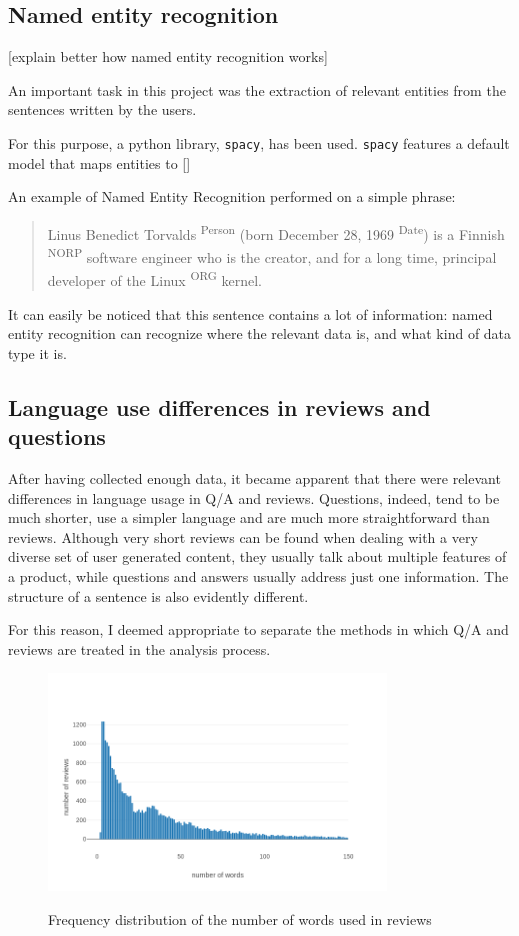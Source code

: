 \documentclass[LaM,binding=0.6cm]{sapthesis}
\begin{document}
\subsection{Named entity recognition}

[explain better how named entity recognition works]

An important task in this project was the extraction of relevant entities from the sentences written by the users.

For this purpose, a python library, \texttt{spacy}, has been used. \texttt{spacy} features a default model that maps entities to []

An example of Named Entity Recognition performed on a simple phrase:
\begin{quote}
Linus Benedict Torvalds \textsuperscript{Person} (born December 28, 1969 \textsuperscript{Date}) is a Finnish \textsuperscript{NORP} software engineer who is the creator, and for a long time, principal developer of the Linux \textsuperscript{ORG} kernel.
\end{quote}

It can easily be noticed that this sentence contains a lot of information: named entity recognition can recognize where the relevant data is, and what kind of data type it is.

\subsection{Language use differences in reviews and questions}

After having collected enough data, it became apparent that there were relevant differences in language usage in Q/A and reviews. Questions, indeed, tend to be much shorter, use a simpler language and are much more straightforward than reviews. Although very short reviews can be found when dealing with a very diverse set of user generated content, they usually talk about multiple features of a product, while questions and answers usually address just one information. The structure of a sentence is also evidently different.

For this reason, I deemed appropriate to separate the methods in which Q/A and reviews are treated in the analysis process.

\begin{figure}
\centering
\includegraphics[width=0.8\textwidth]{pictures/reviews_freq_dist.png}\\[3ex]
\caption{Frequency distribution of the number of words used in reviews}
\label{fig:rev-freq-dist}
\end{figure}
\end{document}
